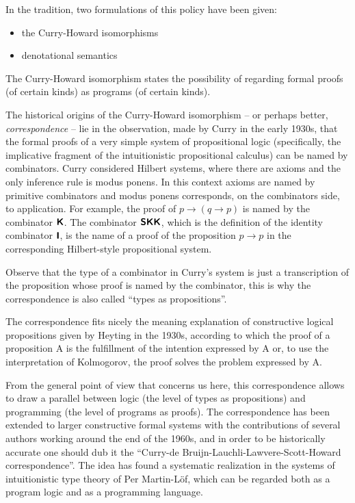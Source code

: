 \documentclass[]{article}
\begin{document}
In the tradition, two formulations of this policy have been given:

\begin{itemize}
\item the Curry-Howard isomorphisms
\item denotational semantics
\end{itemize}




{\color{red}{this passage is inspired by Jean-Baptiste's note}}


The Curry-Howard isomorphism states the possibility of regarding formal proofs (of certain kinds) as programs (of certain kinds).

The historical origins of the Curry-Howard isomorphism -- or perhaps better, \emph{correspondence} -- lie in the observation, made by Curry in the early 1930s, that the formal proofs of a very simple system of propositional logic (specifically, the implicative fragment of the intuitionistic propositional calculus) can be named by combinators. Curry considered Hilbert systems, where there are axioms and the only inference rule is modus ponens. In this context axioms are named by primitive combinators and modus ponens corresponds, on the combinators side, to application. For example, the proof of $p \to (q \to p)$ is named by the combinator $\textbf{\textsf{K}}$. The combinator $\textbf{\textsf{S}}\textbf{\textsf{K}}\textbf{\textsf{K}}$, which is the definition of the identity combinator
$\textbf{\textsf{I}}$, is the name of a proof of the proposition $p \to p$ in the corresponding Hilbert-style propositional system.

Observe that the type of a combinator in Curry's system is just a transcription of the proposition whose proof is named by the combinator,
this is why the correspondence is also called ``types as propositions''.

The correspondence fits nicely the meaning explanation of constructive logical propositions given by Heyting in the 1930s, according to which the proof of a proposition A is the fulfillment of the intention expressed by A or, to use the interpretation of Kolmogorov, the proof solves the problem expressed by A.

From the general point of view that concerns us here, this correspondence allows to draw a parallel between logic (the level of types as propositions) and programming (the level of programs as proofs). The correspondence has been extended to larger constructive formal systems with the contributions of several authors working around the end of the 1960s, and in order to be historically accurate one should dub it the ``Curry-de Bruijn-Lauchli-Lawvere-Scott-Howard correspondence''. The idea has found a systematic realization in the systems of intuitionistic type theory of Per Martin-L\"of, which can be regarded both as a program logic and as a programming language.
\end{document}
